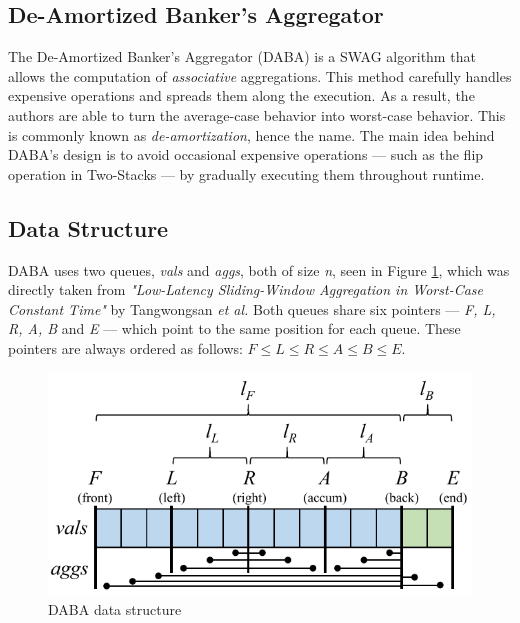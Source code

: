 \subsection{De-Amortized Banker’s Aggregator} \label{sec:daba}

The De-Amortized Banker’s Aggregator (DABA) \cite{Tangwongsan-DABA} is a SWAG algorithm that allows the computation of \textit{associative} aggregations. This method carefully handles expensive operations and spreads them along the execution. As a result, the authors are able to turn the average-case behavior into worst-case behavior. This is commonly known as \textit{de-amortization}, hence the name. The main idea behind DABA's design is to avoid occasional expensive operations --- such as the flip operation in Two-Stacks --- by gradually executing them throughout runtime.

\subsection*{Data Structure}

DABA uses two queues, \textit{vals} and \textit{aggs}, both of size \textit{n}, seen in Figure \ref{fig:daba-ds}, which was directly taken from \textit{"Low-Latency Sliding-Window Aggregation in Worst-Case Constant Time"} by Tangwongsan \emph{et al.} Both queues share six pointers --- \textit{F, L, R, A, B} and \textit{E} --- which point to the same position for each queue. These pointers are always ordered as follows: $F \leq L \leq R \leq A \leq B \leq E$.

\begin{figure}[!htb]
    \begin{center}
      \includegraphics[scale=0.6]{figures/daba-ds.png}
      \caption[DABA data structure]{DABA data structure \cite{Tangwongsan-DABA}}
      \label{fig:daba-ds}
    \end{center}
\end{figure}

